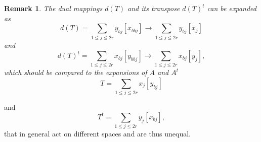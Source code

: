\documentclass[aps,preprint]{revtex4}
\newtheorem{remark}[theorem]{Remark}
\begin{document}
\begin{remark}
The dual mappings $d\left( T\right) $ and its transpose $d\left( T\right)
^{t}$ can be expanded as 
\begin{equation}
d\left( T\right) =\sum_{1\leq j\leq 2r}y_{bj}\left[ x_{bbj}\right]
\rightarrow \sum_{1\leq j\leq 2r}y_{bj}\left[ x_{j}\right]
\end{equation}%
and 
\begin{equation}
d\left( T\right) ^{t}=\sum_{1\leq j\leq 2r}x_{bj}\left[ y_{bbj}\right]
\rightarrow \sum_{1\leq j\leq 2r}x_{bj}\left[ y_{j}\right] ,
\end{equation}%
which should be compared to the expansions of $A$ and $A^{t}$%
\begin{equation}
T=\sum_{1\leq j\leq 2r}x_{j}\left[ y_{bj}\right]
\end{equation}
\end{remark}

and 
\begin{equation}
T^{t}=\sum_{1\leq j\leq 2r}y_{j}\left[ x_{bj}\right] ,
\end{equation}%
that in general act on different spaces and are thus unequal.
\end{document}
